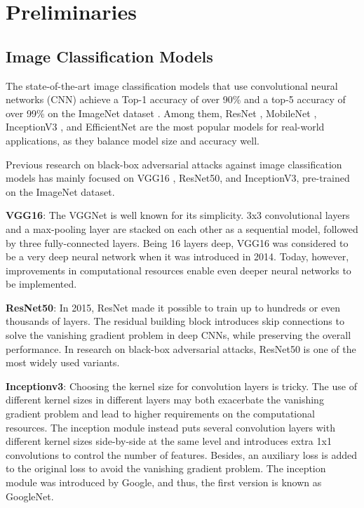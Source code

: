 \section{Preliminaries}

\subsection{Image Classification Models}

The state-of-the-art image classification models that use convolutional neural networks (CNN) achieve a Top-1 accuracy of over 90\% and a top-5 accuracy of over 99\% on the ImageNet dataset \cite{pham2021meta}. Among them, ResNet \cite{he2016deep}, MobileNet \cite{howard2017mobilenets}, InceptionV3 \cite{szegedy2016rethinking}, and EfficientNet \cite{tan2019efficientnet} are the most popular models for real-world applications, as they balance model size and accuracy well. 

Previous research on black-box adversarial attacks against image classification models has mainly focused on VGG16 \cite{simonyan2014very}, ResNet50, and InceptionV3, pre-trained on the ImageNet \cite{russakovsky2015imagenet} dataset.

\textbf{VGG16}: The VGGNet is well known for its simplicity. 3x3 convolutional layers and a max-pooling layer are stacked on each other as a sequential model, followed by three fully-connected layers. Being 16 layers deep, VGG16 was considered to be a very deep neural network when it was introduced in 2014. Today, however, improvements in computational resources enable even deeper neural networks to be implemented.

\textbf{ResNet50}: In 2015, ResNet made it possible to train up to hundreds or even thousands of layers. The residual building block introduces skip connections to solve the vanishing gradient problem in deep CNNs, while preserving the overall performance. In research on black-box adversarial attacks, ResNet50 is one of the most widely used variants.

\textbf{Inceptionv3}: Choosing the kernel size for convolution layers is tricky. The use of different kernel sizes in different layers may both exacerbate the vanishing gradient problem and lead to higher requirements on the computational resources. The inception module instead puts several convolution layers with different kernel sizes side-by-side at the same level and introduces extra 1x1 convolutions to control the number of features. Besides, an auxiliary loss is added to the original loss to avoid the vanishing gradient problem. The inception module was introduced by Google, and thus, the first version is known as GoogleNet.

